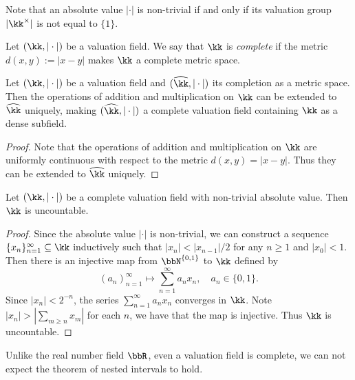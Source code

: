     Note that an absolute value \(|\cdot|\) is non-trivial if and only if its valuation group \(|\kk^\times|\) is not equal to \(\{1\}\).

    \begin{definition}\label{def:complete_valuation_field}
        Let \((\kk,|\cdot|)\) be a valuation field.
        We say that \(\kk\) is \emph{complete} if the metric \(d(x,y) := |x - y|\) makes \(\kk\) a complete metric space.
    \end{definition}

    \begin{lemma}\label{lem:completion_of_valuation_field}
        Let \((\kk,|\cdot|)\) be a valuation field and \((\widehat{\kk},|\cdot|)\) its completion as a metric space.
        Then the operations of addition and multiplication on \(\kk\) can be extended to \(\widehat{\kk}\) uniquely, making \((\widehat{\kk},|\cdot|)\) a complete valuation field containing \(\kk\) as a dense subfield.
    \end{lemma}
    \begin{proof}
        Note that the operations of addition and multiplication on \(\kk\) are uniformly continuous with respect to the metric \(d(x,y) = |x - y|\).
        Thus they can be extended to \(\widehat{\kk}\) uniquely.
    \end{proof}

    \begin{proposition}\label{prop:non-trivial_complete_field_is_uncountable}
        Let \((\kk,|\cdot|)\) be a complete valuation field with non-trivial absolute value.
        Then \(\kk\) is uncountable.
    \end{proposition}
    \begin{proof}
        Since the absolute value \(|\cdot|\) is non-trivial, we can construct a sequence \(\{x_n\}_{n=1}^\infty \subseteq \kk\) inductively such that \(|x_n| < |x_{n-1}|/2\) for any \(n\geq 1\) and \(|x_0| < 1\).
        Then there is an injective map from \(\bbN^{\{0,1\}}\) to \(\kk\) defined by
        \[ (a_n)_{n=1}^\infty \mapsto \sum_{n=1}^\infty a_n x_n, \quad a_n \in \{0,1\}. \]
        Since \(|x_n| < 2^{-n}\), the series \(\sum_{n=1}^\infty a_n x_n\) converges in \(\kk\).
        Note \(|x_n| > |\sum_{m\geq n} x_m|\) for each \(n\), we have that the map is injective.
        Thus \(\kk\) is uncountable.
    \end{proof}

    Unlike the real number field \(\bbR\), even a valuation field is complete, we can not expect the theorem of nested intervals to hold.

